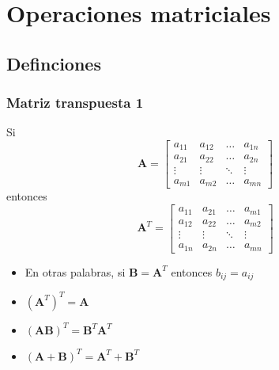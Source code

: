 \documentclass{beamer}
\begin{document}
\section{Operaciones matriciales}
\subsection{Definciones}
\begin{frame}
\frametitle{Matriz transpuesta 1}
Si 
\begin{equation*}
\boldsymbol{A} = \begin{bmatrix} a_{11} &  a_{12} & \dots & a_{1n}\\ a_{21} &  a_{22} & \dots & a_{2n} \\ \vdots &  \vdots & \ddots & \vdots \\ a_{m1} &  a_{m2} & \dots & a_{mn} \end{bmatrix}
\end{equation*}
entonces 
\begin{equation*}
\boldsymbol{A}^T = \begin{bmatrix} a_{11} &  a_{21} & \dots & a_{m1}\\ a_{12} &  a_{22} & \dots & a_{m2} \\ \vdots &  \vdots & \ddots & \vdots \\ a_{1n} &  a_{2n} & \dots & a_{mn} \end{bmatrix}
\end{equation*}
\begin{itemize}
\item En otras palabras, si $\boldsymbol{B}= \boldsymbol{A}^T$ entonces $b_{ij}=a_{ij}$
\item $(\boldsymbol{A}^T)^T= \boldsymbol{A}$
\item $(\boldsymbol{A}\boldsymbol{B})^T= \boldsymbol{B}^T \boldsymbol{A}^T $
\item $(\boldsymbol{A}+ \boldsymbol{B})^T= \boldsymbol{A}^T + \boldsymbol{B}^T $
\end{itemize}
\end{frame}
\end{document}
